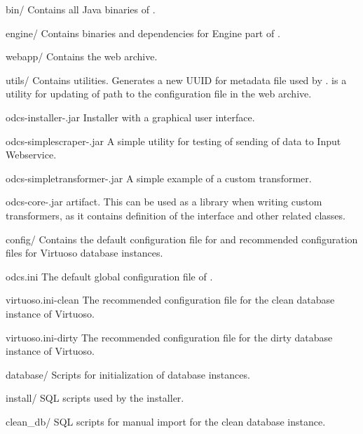 \begin{dirlistbrief}
    \item[bin/] Contains all Java binaries of \odcs.
        \begin{dirlist}
            \item[engine/] Contains binaries and dependencies for Engine part of \odcs.
            \item[webapp/] Contains the \FE web archive.
            \item[utils/] Contains utilities.  Generates a new UUID for metadata file used by .  is a utility for updating of path to the \odcs configuration file in the \FE web archive.
            \item[odcs-installer-\varcode{version}.jar] Installer with a graphical user interface.
            \item[odcs-simplescraper-\varcode{version}.jar] A simple utility for testing of sending of data to Input Webservice.
            \item[odcs-simpletransformer-\varcode{version}.jar] A simple example of a custom transformer.
            \item[odcs-core-\varcode{version}.jar]  artifact. This can be used as a library when writing custom transformers, as it contains definition of the  interface and other related classes.
        \end{dirlist}
    \item[config/] Contains the default configuration file for \odcs and recommended configuration files for Virtuoso database instances.
        \begin{dirlist}
            \item[odcs.ini] The default global configuration file of \odcs.
            \item[virtuoso.ini-clean] The recommended configuration file for the clean database instance of Virtuoso.
            \item[virtuoso.ini-dirty] The recommended configuration file for the dirty database instance of Virtuoso.
        \end{dirlist}
    \item[database/] Scripts for initialization of database instances.
        \begin{dirlist}
            \item[install/] SQL scripts used by the installer.
            \item[clean\_db/] SQL scripts for manual import for the clean database instance.

\end{dirlist}
\end{dirlistbrief}
